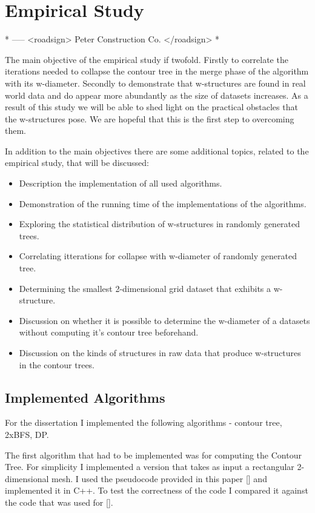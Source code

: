 \chapter{Empirical Study}
\label{chapter3}

* ----- <roadsign> Peter Construction Co. </roadsign> *


The main objective of the empirical study if twofold. Firstly to correlate the iterations needed to collapse the contour tree in the merge phase of the algorithm with its w-diameter. Secondly to demonstrate that w-structures are found in real world data and do appear more abundantly as the size of datasets increases. As a result of this study we will be able to shed light on the practical obstacles that the w-structures pose. We are hopeful that this is the first step to overcoming them.

In addition to the main objectives there are some additional topics, related to the empirical study, that will be discussed:

\begin{itemize}
    \item Description the implementation of all used algorithms.
    \item Demonstration of the running time of the implementations of the algorithms.
    \item Exploring the statistical distribution of w-structures in randomly generated trees.
    \item Correlating itterations for collapse with w-diameter of randomly generated tree.
    \item Determining the smallest 2-dimensional grid dataset that exhibits a w-structure.
    \item Discussion on whether it is possible to determine the w-diameter of a datasets without computing it's contour tree beforehand.
    \item Discussion on the kinds of structures in raw data that produce w-structures in the contour trees.
\end{itemize}


\section{Implemented Algorithms}

For the dissertation I implemented the following algorithms - contour tree, 2xBFS, DP.

The first algorithm that had to be implemented was for computing the Contour Tree. For simplicity I implemented a version that takes as input a rectangular 2-dimensional mesh. I used the pseudocode provided in this paper [] and implemented it in C++. To test the correctness of the code I compared it against the code that was used for [].

